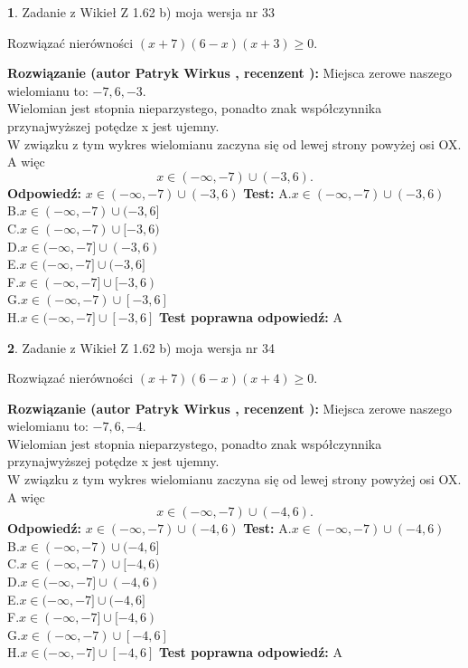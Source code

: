 \documentclass[12pt, a4paper]{article}
\theoremstyle{definition} %
\newtheorem{zad}{}
\newcommand{\zadStart}[1]{\begin{zad}#1\newline}
\newcommand{\zadStop}{\end{zad}}
\newcommand{\rozwStart}[2]{\noindent \textbf{Rozwiązanie (autor #1 , recenzent #2): }\newline}
\newcommand{\rozwStop}{\newline}
\newcommand{\odpStart}{\noindent \textbf{Odpowiedź:}\newline}
\newcommand{\odpStop}{\newline}
\newcommand{\testStart}{\noindent \textbf{Test:}\newline}
\newcommand{\testStop}{\newline}
\newcommand{\kluczStart}{\noindent \textbf{Test poprawna odpowiedź:}\newline}
\newcommand{\kluczStop}{\newline}
\begin{document}
\zadStart{Zadanie z Wikieł Z 1.62 b) moja wersja nr 33}

Rozwiązać nierówności $(x+7)(6-x)(x+3)\ge0$.
\zadStop
\rozwStart{Patryk Wirkus}{}
Miejsca zerowe naszego wielomianu to: $-7, 6, -3$.\\
Wielomian jest stopnia nieparzystego, ponadto znak współczynnika przy\linebreak najwyższej potędze x jest ujemny.\\ W związku z tym wykres wielomianu zaczyna się od lewej strony powyżej osi OX. A więc $$x \in (-\infty,-7) \cup (-3,6).$$
\rozwStop
\odpStart
$x \in (-\infty,-7) \cup (-3,6)$
\odpStop
\testStart
A.$x \in (-\infty,-7) \cup (-3,6)$\\
B.$x \in (-\infty,-7) \cup (-3,6]$\\
C.$x \in (-\infty,-7) \cup [-3,6)$\\
D.$x \in (-\infty,-7] \cup (-3,6)$\\
E.$x \in (-\infty,-7] \cup (-3,6]$\\
F.$x \in (-\infty,-7] \cup [-3,6)$\\
G.$x \in (-\infty,-7) \cup [-3,6]$\\
H.$x \in (-\infty,-7] \cup [-3,6]$
\testStop
\kluczStart
A
\kluczStop



\zadStart{Zadanie z Wikieł Z 1.62 b) moja wersja nr 34}

Rozwiązać nierówności $(x+7)(6-x)(x+4)\ge0$.
\zadStop
\rozwStart{Patryk Wirkus}{}
Miejsca zerowe naszego wielomianu to: $-7, 6, -4$.\\
Wielomian jest stopnia nieparzystego, ponadto znak współczynnika przy\linebreak najwyższej potędze x jest ujemny.\\ W związku z tym wykres wielomianu zaczyna się od lewej strony powyżej osi OX. A więc $$x \in (-\infty,-7) \cup (-4,6).$$
\rozwStop
\odpStart
$x \in (-\infty,-7) \cup (-4,6)$
\odpStop
\testStart
A.$x \in (-\infty,-7) \cup (-4,6)$\\
B.$x \in (-\infty,-7) \cup (-4,6]$\\
C.$x \in (-\infty,-7) \cup [-4,6)$\\
D.$x \in (-\infty,-7] \cup (-4,6)$\\
E.$x \in (-\infty,-7] \cup (-4,6]$\\
F.$x \in (-\infty,-7] \cup [-4,6)$\\
G.$x \in (-\infty,-7) \cup [-4,6]$\\
H.$x \in (-\infty,-7] \cup [-4,6]$
\testStop
\kluczStart
A
\kluczStop
\end{document}
